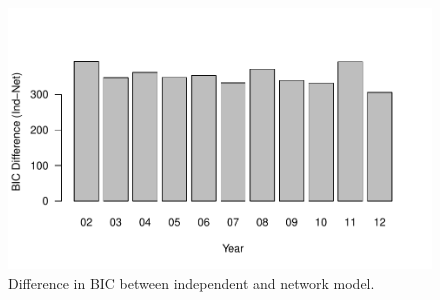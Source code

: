 \documentclass[reqno,onecolumn,letterpaper,12pt]{article}
\begin{document}
\begin{figure}[!h]
\centering
\includegraphics[scale=.75]{draft_figures/BICdiff.pdf} \vspace{-.5cm}
\caption{\label{fig:bic} Difference in BIC between independent and network model.}
\end{figure}
\end{document}
